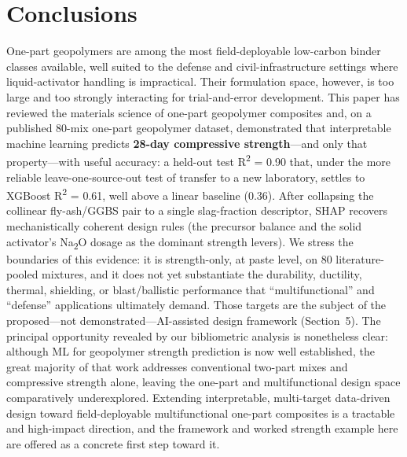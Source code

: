 \documentclass[materials,article,submit,pdftex,moreauthors]{Definitions/mdpi}
\begin{document}
\section{Conclusions}
One-part geopolymers are among the most field-deployable low-carbon binder classes available, well suited to the defense and civil-infrastructure settings where liquid-activator handling is impractical. Their formulation space, however, is too large and too strongly interacting for trial-and-error development. This paper has reviewed the materials science of one-part geopolymer composites and, on a published 80-mix one-part geopolymer dataset, demonstrated that interpretable machine learning predicts \textbf{28-day compressive strength}---and only that property---with useful accuracy: a held-out test R\textsuperscript{2} = 0.90 that, under the more reliable leave-one-source-out test of transfer to a new laboratory, settles to XGBoost R\textsuperscript{2} = 0.61, well above a linear baseline (0.36). After collapsing the collinear fly-ash/GGBS pair to a single slag-fraction descriptor, SHAP recovers mechanistically coherent design rules (the precursor balance and the solid activator's Na\textsubscript{2}O dosage as the dominant strength levers). We stress the boundaries of this evidence: it is strength-only, at paste level, on 80 literature-pooled mixtures, and it does not yet substantiate the durability, ductility, thermal, shielding, or blast/ballistic performance that ``multifunctional'' and ``defense'' applications ultimately demand. Those targets are the subject of the proposed---not demonstrated---AI-assisted design framework (Section~5). The principal opportunity revealed by our bibliometric analysis is nonetheless clear: although ML for geopolymer strength prediction is now well established, the great majority of that work addresses conventional two-part mixes and compressive strength alone, leaving the one-part and multifunctional design space comparatively underexplored. Extending interpretable, multi-target data-driven design toward field-deployable multifunctional one-part composites is a tractable and high-impact direction, and the framework and worked strength example here are offered as a concrete first step toward it.

\vspace{6pt}

\end{document}
